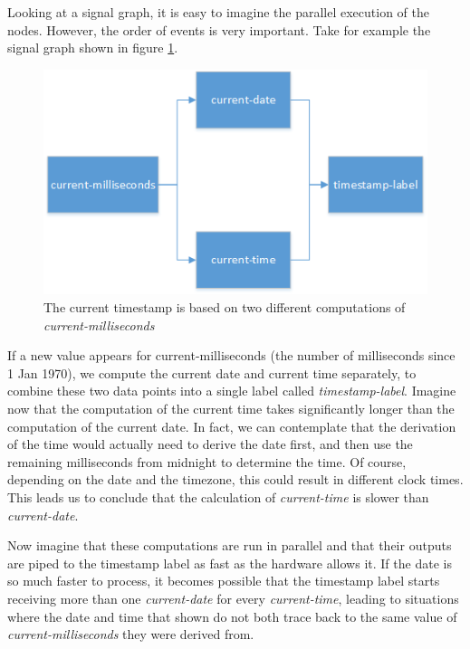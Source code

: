Looking at a signal graph, it is easy to imagine the parallel execution of the nodes. However, the order of events is very important. 
Take for example the signal graph shown in figure \ref{fig:relatedwork-elm-eventsorder}.

\begin{figure}[h!]
	\includegraphics[width=\textwidth]{images/RelatedWork-Elm-EventsOrder.png}
	\caption{The current timestamp is based on two different computations of \textit{current-milliseconds}}
	\label{fig:relatedwork-elm-eventsorder}
\end{figure}

If a new value appears for current-milliseconds (the number of milliseconds since 1 Jan 1970), we compute the current date and current time separately, to combine these two data points into a single label called \textit{timestamp-label}. Imagine now that the computation of the current time takes significantly longer than the computation of the current date. In fact, we can contemplate that the derivation of the time would actually need to derive the date first, and then use the remaining milliseconds from midnight to determine the time. Of course, depending on the date and the timezone, this could result in different clock times.
This leads us to conclude that the calculation of \textit{current-time} is slower than \textit{current-date}. 

Now imagine that these computations are run in parallel and that their outputs are piped to the timestamp label as fast as the hardware allows it. If the date is so much faster to process, it becomes possible that the timestamp label starts receiving more than one \textit{current-date} for every \textit{current-time}, leading to situations where the date and time that shown do not both trace back to the same value of \textit{current-milliseconds} they were derived from. 

